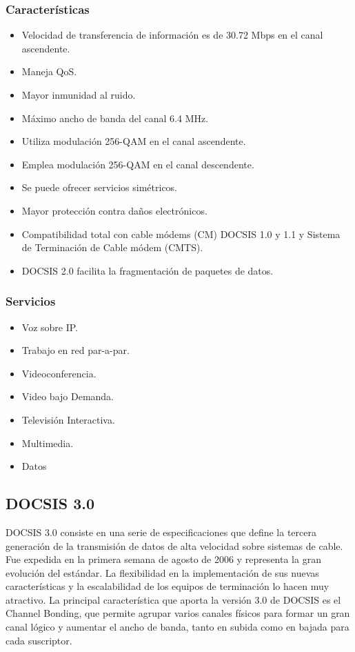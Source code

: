 \subsubsection*{Características}

\begin{itemize}
\item Velocidad de transferencia de información es de 30.72 Mbps en el canal ascendente. 
\item Maneja QoS. 
\item Mayor inmunidad al ruido. 
\item Máximo ancho de banda del canal 6.4 MHz. 
\item Utiliza modulación 256-QAM en el canal ascendente. 
\item Emplea modulación 256-QAM en el canal descendente.
\item Se puede ofrecer servicios simétricos.
\item Mayor protección contra daños electrónicos. 
\item Compatibilidad total con cable módems (CM) DOCSIS 1.0 y 1.1 y Sistema de Terminación de Cable módem (CMTS).
\item DOCSIS 2.0 facilita la fragmentación de paquetes de datos.
\end{itemize}

\subsubsection*{Servicios}

\begin{itemize}
\item Voz sobre IP. 
\item Trabajo en red par-a-par. 
\item Videoconferencia. 
\item Video bajo Demanda. 
\item Televisión Interactiva. 
\item Multimedia. 
\item Datos
\end{itemize}

\subsection*{DOCSIS 3.0}
DOCSIS 3.0 consiste en una serie de especificaciones que define la tercera generación de la transmisión de datos de alta velocidad sobre sistemas de cable. Fue expedida en la primera semana de agosto de 2006 y representa la gran evolución del estándar. La flexibilidad en la implementación de sus nuevas características y la escalabilidad de los equipos de terminación lo hacen muy atractivo. La principal característica que aporta la versión 3.0 de DOCSIS es el Channel Bonding, que permite agrupar varios canales físicos para formar un gran canal lógico y aumentar el ancho de banda, tanto en subida como en bajada para cada suscriptor.


